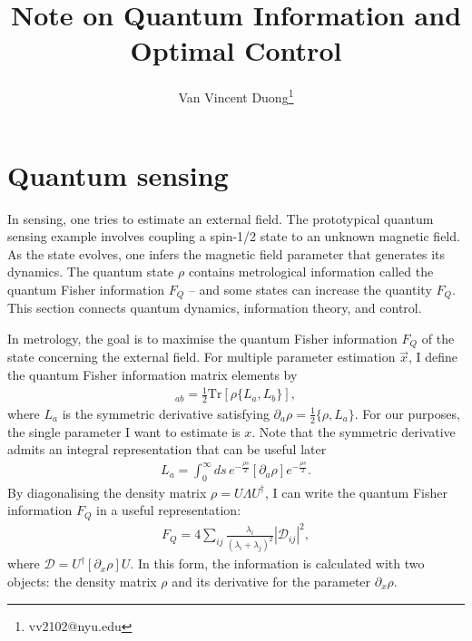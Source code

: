 \documentclass[12pt]{article}
\title{Note on Quantum Information and Optimal Control}
\author[1]{Van Vincent Duong\thanks{vv2102@nyu.edu}}
\affil[1]{Department of Physics, New York Univesity, New York, NY, USA}
\newcommand{\Tr}{\mathrm{Tr}}
\begin{document}
\maketitle

\begin{abstract}
  
\end{abstract}

\newpage

\tableofcontents

\section{Quantum sensing}

In sensing, one tries to estimate an external field.  The prototypical quantum sensing example involves coupling a spin-1/2 state to an unknown magnetic field.  As the state evolves, one infers the magnetic field parameter that generates its dynamics.  The quantum state $\rho$ contains metrological information called the quantum Fisher information $F_Q$ -- and some states can increase the quantity $F_Q$.  This section connects quantum dynamics, information theory, and control.

In metrology, the goal is to maximise the quantum Fisher information $F_{Q}$ of the state concerning the external field.  For multiple parameter estimation $\vec{x}$, I define the quantum Fisher information matrix elements by
\begin{align}
    [F_Q]_{ab} = \frac{1}{2}\Tr\left[ \rho \{L_a, L_b\} \right],
\end{align}
where $L_a$ is the symmetric derivative satisfying $\partial_a \rho = \tfrac{1}{2}\{\rho, L_a \}$. For our purposes, the single parameter I want to estimate is $x$.  Note that the symmetric derivative admits an integral representation that can be useful later
\begin{align*}
    L_a = \int_{0}^{\infty} ds \, e^{-\frac{\rho s}{2}} [\partial_a \rho] e^{-\frac{\rho s}{2}}.
\end{align*}
By diagonalising the density matrix $\rho = U \Lambda U^\dagger$, I can write the quantum Fisher information $F_Q$ in a useful representation:
\begin{align}
    F_Q = 4 \sum_{ij} \frac{\lambda_i }{(\lambda_i + \lambda_j)^2}|\mathcal{D}_{ij}|^2,
\end{align}
where $\mathcal{D} = U^\dagger [\partial_x \rho] U$. In this form, the information is calculated with two objects: the density matrix $\rho$ and its derivative for the parameter $\partial_x \rho$. 
\end{document}
